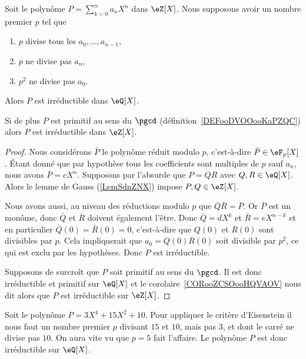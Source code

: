 \begin{proposition}
	Soit le polynôme \( P=\sum_{k=0}^n a_nX^n\) dans \( \eZ[X]\). Nous supposons avoir un nombre premier \( p\) tel que
	\begin{enumerate}
		\item
		      \( p\) divise tous les \( a_0,\ldots, a_{n-1}\),
		\item
		      \( p\) ne divise pas \( a_n\),
		\item
		      \( p^2\) ne divise pas \( a_0\).
	\end{enumerate}
	Alors \( P\) est irréductible dans \( \eQ[X]\).

	Si de plus \( P\) est primitif au sens du \( \pgcd\) (définition~\ref{DEFooDVOOooKaPZQC}) alors \( P\) est irréductible dans \( \eZ[X]\).
\end{proposition}

\begin{proof}
	Nous considérons \( \bar P\) le polynôme réduit modulo \( p\), c'est-à-dire \( \bar P\in \eF_p[X]\). Étant donné que par hypothèse tous les coefficients sont multiples de \( p\) sauf \( a_n\), nous avons \( \bar P=cX^n\). Supposons par l'absurde que \( P=QR\) avec \( Q,R\in \eQ[X]\). Alors le lemme de Gauss (\ref{LemSdnZNX}) impose \( P,Q\in \eZ[X]\).

	Nous avons aussi, au niveau des réductions modulo \( p\) que \( \bar Q\bar R=\bar P\). Or \( \bar P\) est un monôme, donc \( \bar Q\) et \( \bar R\) doivent également l'être. Donc \( \bar Q=dX^k\) et \( \bar R=eX^{n-k}\) et en particulier \( \bar Q(0)=\bar R(0)=0\), c'est-à-dire que \( Q(0)\) et \( R(0)\) sont divisibles par \( p\). Cela impliquerait que \( a_0=Q(0)R(0)\) soit divisible par \( p^2\), ce qui est exclu par les hypothèses. Donc \( P\) est irréductible.

	Supposons de surcroît que \( P\) soit primitif au sens du \( \pgcd\). Il est donc irréductible et primitif sur \( \eQ[X]\) et le corolaire~\ref{CORooZCSOooHQVAOV} nous dit alors que \( P\) est irréductible sur \( \eZ[X]\).
\end{proof}

\begin{example}
	Soit le polynôme \( P=3X^4+15 X^2+10\). Pour appliquer le critère d'Eisenstein il nous faut un nombre premier \( p\) divisant \( 15\) et \( 10\), mais pas \( 3\), et dont le carré ne divise pas \( 10\). On aura vite vu que \( p=5\) fait l'affaire. Le polynôme \( P\) est donc irréductible sur \( \eQ[X]\).
\end{example}

